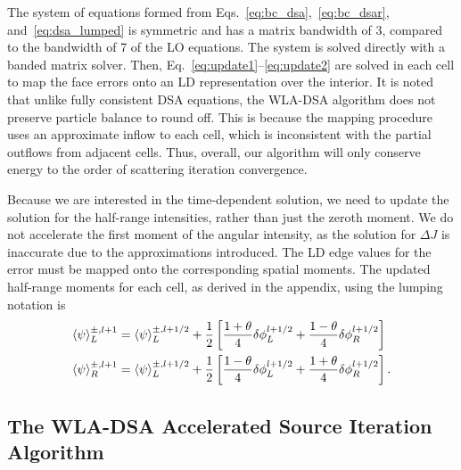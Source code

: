 The system of equations formed from Eqs.~\eqref{eq:bc_dsa},~\eqref{eq:bc_dsar},
and~\eqref{eq:dsa_lumped} is symmetric and has a matrix bandwidth of 3, compared to the
bandwidth of 7 of the LO equations.  The system is solved directly with a banded matrix solver. Then,
Eq.~\eqref{eq:update1}--\eqref{eq:update2} are solved in each cell to map the face errors onto
an LD representation over the interior.   It is noted that unlike fully consistent DSA equations, the WLA-DSA algorithm does not
preserve particle balance to round off.  This is because the mapping procedure uses an
approximate inflow to each cell, which is inconsistent with the partial outflows from
adjacent cells.  Thus, overall, our algorithm will only conserve energy to the order of
scattering iteration convergence.

Because we are interested in the time-dependent solution, we need to update the solution for the
half-range intensities, rather than just the zeroth moment. We do not accelerate the first
moment of the angular intensity, as the solution for $\Delta J$ is inaccurate due to the
approximations introduced.  The LD edge values for the error must be mapped onto the corresponding spatial moments.
The updated half-range moments for each cell, as derived in the appendix, using
the lumping notation is\begin{align}\label{eq:up1}
    \langle \psi \rangle_{L}^{\pm,l+1} &= \langle \psi \rangle_{L}^{\pm,l+1/2} + \frac{1}{2}\left[ \frac{1+\theta}{4}\delta \phi_{L}^{l+1/2} +
    \frac{1-\theta}{4}\delta \phi_{R}^{l+1/2} \right] \\ \label{eq:up2}
    \langle \psi \rangle_{R}^{\pm,l+1} &= \langle \psi \rangle_{L}^{\pm,l+1/2} + \frac{1}{2}\left[ \frac{1-\theta}{4}\delta \phi^{l+1/2}_{L} +
\frac{1+\theta}{4}\delta \phi^{l+1/2}_{R}  \right]    .
\end{align}


\subsection{The WLA-DSA Accelerated Source Iteration Algorithm}

